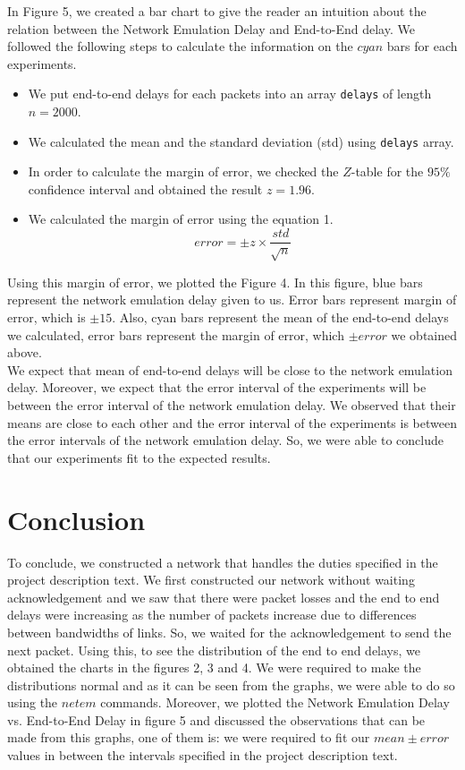 \documentclass[conference]{IEEEtran}
\begin{document}
In Figure 5, we created a bar chart to give the reader an intuition about the relation between the Network Emulation Delay and End-to-End delay. We followed the following steps to calculate the information on the $cyan$ bars for each experiments.

\begin{itemize}
    \item We put end-to-end delays for each packets into an array \texttt{delays} of length $n=2000$. 
    \item We calculated the mean and the standard deviation (std) using \texttt{delays} array.
    \item In order to calculate the margin of error, we checked the $Z$-table for the $95\%$ confidence interval and obtained the result $z=1.96$.
    \item We calculated the margin of error using the equation 1.
    \begin{equation}
    error = \pm z \times \dfrac{std}{\sqrt{n}}\label{eq}
    \end{equation}
\end{itemize}

Using this margin of error, we plotted the Figure 4. In this figure, blue bars represent the network emulation delay given to us. Error bars represent margin of error, which is $\pm 15$. Also, cyan bars represent the mean of the end-to-end delays we calculated, error bars represent the margin of error, which $\pm error$ we obtained above. \\
We expect that mean of end-to-end delays will be close to the network emulation delay. Moreover, we expect that the error interval of the experiments will be between the error interval of the network emulation delay. We observed that their means are close to each other and the error interval of the experiments is between the error intervals of the network emulation delay. So, we were able to conclude that our experiments fit to the expected results.


\section{Conclusion}
To conclude, we constructed a network that handles the duties specified in the project description text. We first constructed our network without waiting acknowledgement and we saw that there were packet losses and the end to end delays were increasing as the number of packets increase due to differences between bandwidths of links. So, we waited for the acknowledgement to send the next packet. Using this, to see the distribution of the end to end delays, we obtained the charts in the figures 2, 3 and 4. We were required to make the distributions normal and as it can be seen from the graphs, we were able to do so using the $netem$ commands. Moreover, we plotted the Network Emulation Delay vs. End-to-End Delay in figure 5 and discussed the observations that can be made from this graphs, one of them is: we were required to fit our $mean\pm error$ values in between the intervals specified in the project description text.
\end{document}

